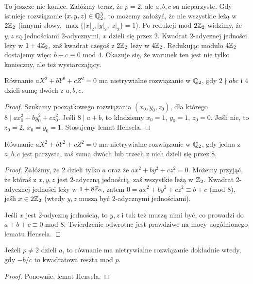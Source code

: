 To jeszcze nie koniec.
Załóżmy teraz, że $p = 2$, ale $a,b,c$ są nieparzyste.
Gdy istnieje rozwiązanie $(x,y,z) \in \mathbb Q_2^3$, to możemy założyć, że nie wszystkie leżą w $2\mathbb Z_2$ (innymi słowy, $\max\{|x|_2, |y|_2, |z|_2\} =1$).
Po redukcji mod $2\mathbb Z_2$ widzimy, że $y,z$ są jednościami $2$-adycznymi, $x$ dzieli się przez $2$.
Kwadrat $2$-adycznej jedności leży w $1+4\mathbb Z_2$, zaś kwadrat czegoś z $2\mathbb Z_2$ leży w $4\mathbb Z_2$. Redukując modulo $4\mathbb Z_2$ dostajemy więc: $b+ c \equiv 0$ mod $4$.
Okazuje się, że warunek ten jest nie tylko konieczny, ale też wystarczający.

\begin{lemat}
	Równanie $aX^2 + bY^2 + cZ^2 = 0$ ma nietrywialne rozwiązanie w $\mathbb Q_2$, gdy $2 \nmid abc$ i $4$ dzieli sumę dwóch z $a, b, c$.
\end{lemat}

\begin{proof}
	Szukamy początkowego rozwiązania $(x_0, y_0, z_0)$, dla którego $8 \mid ax_0^2 + by_0^2 + cz_0^2$.
	Jeśli $8 \mid a+b$, to kładziemy $x_0 = 1$, $y_0 = 1$, $z_0= 0$. Jeśli nie, to $z_0 = 2$, $x_0 = y_0 = 1$.
	Stosujemy lemat Hensela.
\end{proof}

\begin{lemat}
	Równanie $aX^2 + bY^2 + cZ^2 = 0$ ma nietrywialne rozwiązanie w $\mathbb Q_2$, gdy jedna z $a, b, c$ jest parzysta, zaś suma dwóch lub trzech z nich dzieli się przez 8.
\end{lemat}

\begin{proof}
	Załóżmy, że $2$ dzieli tylko $a$ oraz że $ax^2 + by^2 + cz^2 = 0$.
	Możemy przyjąć, że któraś z $x, y,z$ jest $2$-adyczną jednością, zaś wszystkie leżą w $\mathbb Z_2$.
	Kwadrat $2$-adycznej jedności leży w $1 + 8 \mathbb Z_2$, zatem $0 = ax^2 + by^2 + cz^2 \equiv b +c$ (mod $8$), jeśli $x \in 2\mathbb Z_2$ (wtedy $y,z$ muszą być $2$-adycznymi jednościami).

	Jeśli $x$ jest $2$-adyczną jednością, to $y, z$ i tak też muszą nimi być, co prowadzi do $a+b+c \equiv 0$ mod $8$.
	Twierdzenie odwrotne jest prawdziwe na mocy uogólnionego lematu Hensela.
\end{proof}

\begin{lemat}
	Jeżeli $p \neq 2$ dzieli $a$, to równanie ma nietrywialne rozwiązanie dokładnie wtedy, gdy $-b/c$ to kwadratowa reszta mod $p$.
\end{lemat}

\begin{proof}
	Ponownie, lemat Hensela.
\end{proof}

